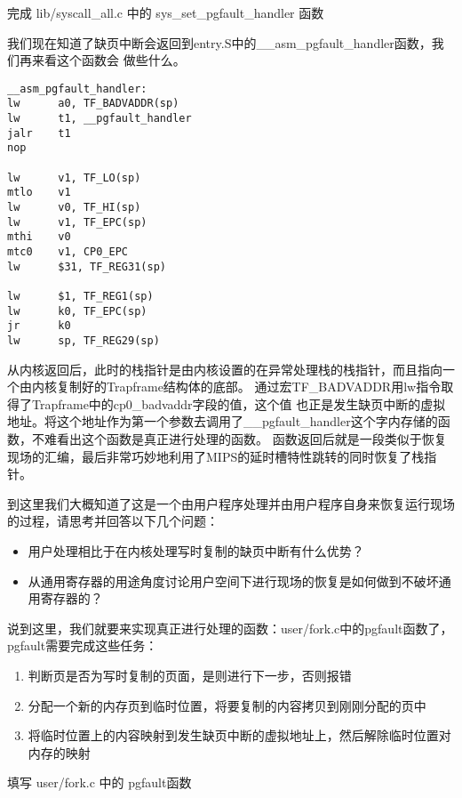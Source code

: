 \begin{exercise}
完成 lib/syscall\_all.c 中的 sys\_set\_pgfault\_handler 函数
\end{exercise}

我们现在知道了缺页中断会返回到entry.S中的\_\_asm\_pgfault\_handler函数，我们再来看这个函数会
做些什么。
\begin{verbatim}
__asm_pgfault_handler:
lw      a0, TF_BADVADDR(sp)
lw      t1, __pgfault_handler
jalr    t1
nop

lw      v1, TF_LO(sp)
mtlo    v1
lw      v0, TF_HI(sp)
lw      v1, TF_EPC(sp)
mthi    v0
mtc0    v1, CP0_EPC
lw      $31, TF_REG31(sp)

lw      $1, TF_REG1(sp)
lw      k0, TF_EPC(sp)
jr      k0
lw      sp, TF_REG29(sp)
\end{verbatim}

从内核返回后，此时的栈指针是由内核设置的在异常处理栈的栈指针，而且指向一个由内核复制好的Trapframe结构体的底部。
通过宏TF\_BADVADDR用lw指令取得了Trapframe中的cp0\_badvaddr字段的值，这个值
也正是发生缺页中断的虚拟地址。将这个地址作为第一个参数去调用了\_\_pgfault\_handler这个字内存储的函数，不难看出这个函数是真正进行处理的函数。
函数返回后就是一段类似于恢复现场的汇编，最后非常巧妙地利用了MIPS的延时槽特性跳转的同时恢复了栈指针。

\begin{thinking}\label{think:pgfault-user-1}
到这里我们大概知道了这是一个由用户程序处理并由用户程序自身来恢复运行现场的过程，请思考并回答以下几个问题：
\begin{itemize}
  \item 用户处理相比于在内核处理写时复制的缺页中断有什么优势？
  \item 从通用寄存器的用途角度讨论用户空间下进行现场的恢复是如何做到不破坏通用寄存器的？
\end{itemize}
\end{thinking}

说到这里，我们就要来实现真正进行处理的函数：user/fork.c中的pgfault函数了，pgfault需要完成这些任务：
\begin{enumerate}
	\item 判断页是否为写时复制的页面，是则进行下一步，否则报错
	\item 分配一个新的内存页到临时位置，将要复制的内容拷贝到刚刚分配的页中
	\item 将临时位置上的内容映射到发生缺页中断的虚拟地址上，然后解除临时位置对内存的映射
\end{enumerate}

\begin{exercise}
填写 user/fork.c 中的 pgfault函数
\end{exercise}

